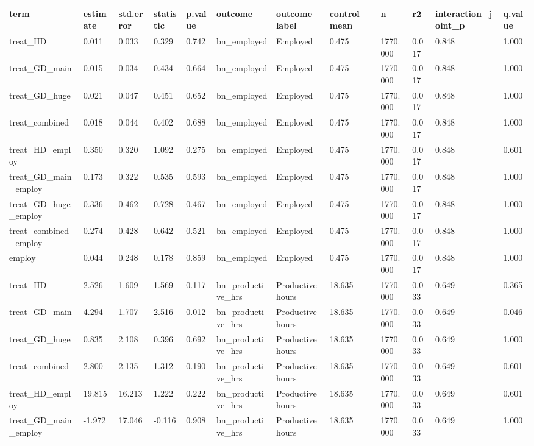 \begin{tabular}{llllllllllll}
\toprule
term & estimate & std.error & statistic & p.value & outcome & outcome\_label & control\_mean & n & r2 & interaction\_joint\_p & q.value
 \\
\midrule
treat\_HD & 0.011 & 0.033 & 0.329 & 0.742 & bn\_employed & Employed & 0.475 & 1770.000 & 0.017 & 0.848 & 1.000 \\
treat\_GD\_main & 0.015 & 0.034 & 0.434 & 0.664 & bn\_employed & Employed & 0.475 & 1770.000 & 0.017 & 0.848 & 1.000 \\
treat\_GD\_huge & 0.021 & 0.047 & 0.451 & 0.652 & bn\_employed & Employed & 0.475 & 1770.000 & 0.017 & 0.848 & 1.000 \\
treat\_combined & 0.018 & 0.044 & 0.402 & 0.688 & bn\_employed & Employed & 0.475 & 1770.000 & 0.017 & 0.848 & 1.000 \\
treat\_HD\_employ & 0.350 & 0.320 & 1.092 & 0.275 & bn\_employed & Employed & 0.475 & 1770.000 & 0.017 & 0.848 & 0.601 \\
treat\_GD\_main\_employ & 0.173 & 0.322 & 0.535 & 0.593 & bn\_employed & Employed & 0.475 & 1770.000 & 0.017 & 0.848 & 1.000 \\
treat\_GD\_huge\_employ & 0.336 & 0.462 & 0.728 & 0.467 & bn\_employed & Employed & 0.475 & 1770.000 & 0.017 & 0.848 & 1.000 \\
treat\_combined\_employ & 0.274 & 0.428 & 0.642 & 0.521 & bn\_employed & Employed & 0.475 & 1770.000 & 0.017 & 0.848 & 1.000 \\
employ & 0.044 & 0.248 & 0.178 & 0.859 & bn\_employed & Employed & 0.475 & 1770.000 & 0.017 & 0.848 & 1.000 \\
treat\_HD & 2.526 & 1.609 & 1.569 & 0.117 & bn\_productive\_hrs & Productive hours & 18.635 & 1770.000 & 0.033 & 0.649 & 0.365 \\
treat\_GD\_main & 4.294 & 1.707 & 2.516 & 0.012 & bn\_productive\_hrs & Productive hours & 18.635 & 1770.000 & 0.033 & 0.649 & 0.046 \\
treat\_GD\_huge & 0.835 & 2.108 & 0.396 & 0.692 & bn\_productive\_hrs & Productive hours & 18.635 & 1770.000 & 0.033 & 0.649 & 1.000 \\
treat\_combined & 2.800 & 2.135 & 1.312 & 0.190 & bn\_productive\_hrs & Productive hours & 18.635 & 1770.000 & 0.033 & 0.649 & 0.601 \\
treat\_HD\_employ & 19.815 & 16.213 & 1.222 & 0.222 & bn\_productive\_hrs & Productive hours & 18.635 & 1770.000 & 0.033 & 0.649 & 0.601 \\
treat\_GD\_main\_employ & -1.972 & 17.046 & -0.116 & 0.908 & bn\_productive\_hrs & Productive hours & 18.635 & 1770.000 & 0.033 & 0.649 & 1.000 \\

\end{tabular}
